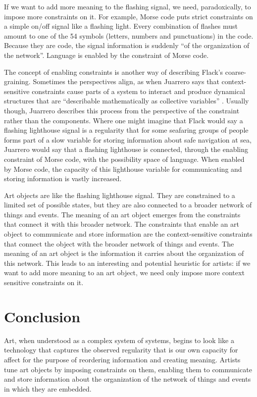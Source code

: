 \documentclass[letterpaper]{article}
\begin{document}
    If we want to add more meaning to the flashing signal, we need, paradoxically, to impose more constraints on it. For example, Morse code puts strict constraints on a simple on/off signal like a flashing light. Every combination of flashes must amount to one of the 54 symbols (letters, numbers and punctuations) in the code. Because they are code, the signal information is suddenly “of the organization of the network”. Language is enabled by the constraint of Morse code.

    The concept of enabling constraints is another way of describing Flack's coarse-graining. Sometimes the perspectives align, as when Juarrero says that context-sensitive constraints cause parts of a system to interact and produce dynamical structures that are “describable mathematically as collective variables” \citep[p.193]{JuarreroThSlfOrgnstnOfIntntnlActn2004}. Usually though, Juarrero describes this process from the perspective of the constraint rather than the components. Where one might imagine that Flack would say a flashing lighthouse signal is a regularity that for some seafaring groups of people forms part of a slow variable for storing information about safe navigation at sea, Juarrero would say that a flashing lighthouse is connected, through the enabling constraint of Morse code, with the possibility space of language. When enabled by Morse code, the capacity of this lighthouse variable for communicating and storing information is vastly increased.

    Art objects are like the flashing lighthouse signal. They are constrained to a limited set of possible states, but they are also connected to a broader network of things and events. The meaning of an art object emerges from the constraints that connect it with this broader network. The constraints that enable an art object to communicate and store information are the context-sensitive constraints that connect the object with the broader network of things and events. The meaning of an art object is the information it carries about the organization of this network. This leads to an interesting and potential heuristic for artists: if we want to add more meaning to an art object, we need only impose more context sensitive constraints on it.

\section{Conclusion}

    Art, when understood as a complex system of systems, begins to look like a technology that captures the observed regularity that is our own capacity for affect for the purpose of reordering information and creating meaning. Artists tune art objects by imposing constraints on them, enabling them to communicate and store information about the organization of the network of things and events in which they are embedded.
\end{document}
